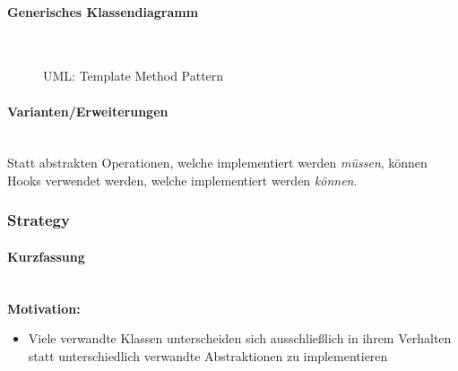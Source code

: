 \documentclass[ngerman,color=3b]{tuda_summary}
\begin{document}
\paragraph{Generisches Klassendiagramm}\mbox{}\\
\begin{figure}[ht]
    \centering
    \caption{UML: Template Method Pattern}
\end{figure}

\paragraph{Varianten/Erweiterungen}\mbox{}\\
Statt abstrakten Operationen, welche implementiert werden \textit{müssen}, können Hooks verwendet werden, welche implementiert werden \textit{können}.

\subsubsection{Strategy}
\paragraph{Kurzfassung}\mbox{}\\
\textbf{Motivation:}
\begin{itemize}
    \item Viele verwandte Klassen unterscheiden sich ausschließlich in ihrem Verhalten statt unterschiedlich verwandte Abstraktionen zu implementieren
\end{itemize}
\end{document}
